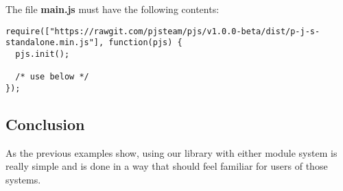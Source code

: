 The file \textbf{main.js} must have the following contents:
\begin{lstlisting}[caption=main.js AMD support]
require(["https://rawgit.com/pjsteam/pjs/v1.0.0-beta/dist/p-j-s-standalone.min.js"], function(pjs) {
  pjs.init();

  /* use below */
});
\end{lstlisting}

\subsection{Conclusion}
As the previous examples show, using our library with either module system is really simple and is done in a way that should feel familiar for users of those systems.

\pagebreak